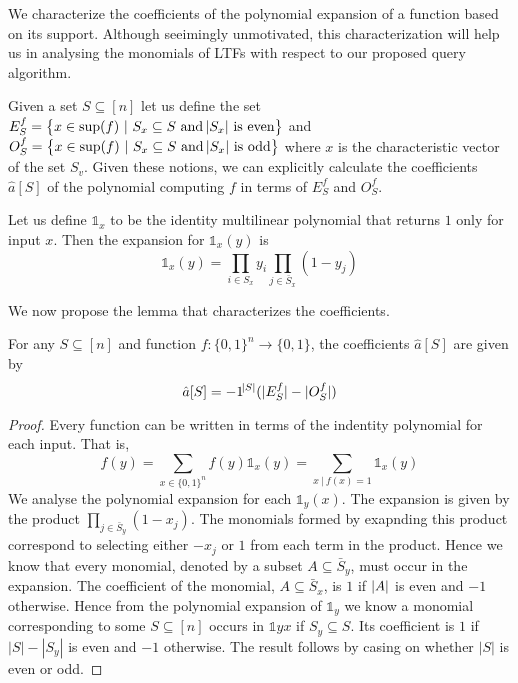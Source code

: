 We characterize the coefficients of the polynomial expansion of a function based on its support. Although seeimingly unmotivated, this characterization will help us in analysing the monomials of LTFs with respect to our proposed query algorithm.

Given a set $S\subseteq [n]$ let us define the set $E^f_S = \set{x\in \sup(f) \ | \ S_x \subseteq S \text{ and $\abs{S_x}$ is even} }$ and $O^f_S = \set{x\in \sup(f) \ | \ S_x \subseteq S \text{ and $\abs{S_x}$ is odd} }$ where $x$ is the characteristic vector of the set $S_v$. Given these notions, we can explicitly calculate the coefficients $\hat{a}[S]$ of the polynomial computing $f$ in terms of $E^f_S$ and $O^f_S$. 

\begin{definition}
	Let us define $\mathds{1}_x$ to be the identity multilinear polynomial that returns $1$ only for input $x$. Then the expansion for $\mathds{1}_x(y)$ is $$\mathds{1}_x(y) = \prod_{i \in S_x} y_i \prod_{j \in \bar{S}_x} (1 - y_j)$$
\end{definition}

We now propose the lemma that characterizes the coefficients. 

\begin{lemma}\label{lemma1}
	For any $S\subseteq [n]$ and function $f: \{0,1\}^n \rightarrow \{0,1\}$, the coefficients $\hat{a}[S]$ are given by 
    \[\hat{a}[S] = -1^{\abs{S}}(\vert E^f_S\vert - \vert O^f_S\vert)\]
	\begin{proof}
		Every function can be written in terms of the indentity polynomial for each input. That is, $$f(y) = \sum_{x \in \{0, 1\}^n} f(y) \mathds{1}_x(y) = \sum_{x \ | \ f(x) = 1} \mathds{1}_x(y)$$
		We analyse the polynomial expansion for each $\mathds{1}_y(x)$. The expansion is given by the product $\prod_{j \in \bar{S}_y} (1 - x_j)$. The monomials formed by exapnding this product correspond to selecting either $-x_j$ or $1$ from each term in the product. Hence we know that every monomial, denoted by a subset $A \subseteq \bar{S}_y$, must occur in the expansion. The coefficient of the monomial, $A \subseteq\bar{S}_x$, is $1$ if $\vert A\vert$ is even and $-1$ otherwise. Hence from the polynomial expansion of $\mathds{1}_y$ we know a monomial corresponding to some $S \subseteq [n]$ occurs in $\mathds{1}yx$ if $S_y \subseteq S$. Its coefficient is $1$ if $|S| - |S_y|$ is even and $-1$ otherwise. The result follows by casing on whether $|S|$ is even or odd.    
	\end{proof}
\end{lemma} 